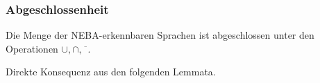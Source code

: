     \begin{frame}
      \frametitle{Abgeschlossenheit}

      \begin{Satz}
        Die Menge der NEBA-erkennbaren Sprachen ist abgeschlossen unter den Operationen
        $\cup,\cap,\overline{\phantom{o}}$.
      \end{Satz}

      \par\bigskip
        Direkte Konsequenz aus den folgenden Lemmata.


    \end{frame}

